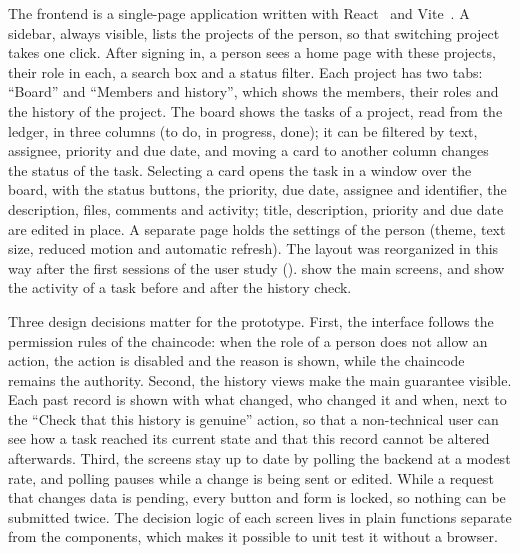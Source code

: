 The frontend is a single-page application written with React~\cite{react} and Vite~\cite{vite}. A sidebar, always visible, lists the projects of the person, so that switching project takes one click. After signing in, a person sees a home page with these projects, their role in each, a search box and a status filter. Each project has two tabs: ``Board'' and ``Members and history'', which shows the members, their roles and the history of the project. The board shows the tasks of a project, read from the ledger, in three columns (to do, in progress, done); it can be filtered by text, assignee, priority and due date, and moving a card to another column changes the status of the task. Selecting a card opens the task in a window over the board, with the status buttons, the priority, due date, assignee and identifier, the description, files, comments and activity; title, description, priority and due date are edited in place. A separate page holds the settings of the person (theme, text size, reduced motion and automatic refresh). The layout was reorganized in this way after the first sessions of the user study ().  show the main screens, and  show the activity of a task before and after the history check.

Three design decisions matter for the prototype. First, the interface follows the permission rules of the chaincode: when the role of a person does not allow an action, the action is disabled and the reason is shown, while the chaincode remains the authority. Second, the history views make the main guarantee visible. Each past record is shown with what changed, who changed it and when, next to the ``Check that this history is genuine'' action, so that a non-technical user can see how a task reached its current state and that this record cannot be altered afterwards. Third, the screens stay up to date by polling the backend at a modest rate, and polling pauses while a change is being sent or edited. While a request that changes data is pending, every button and form is locked, so nothing can be submitted twice. The decision logic of each screen lives in plain functions separate from the components, which makes it possible to unit test it without a browser.

